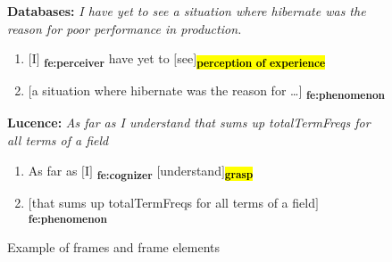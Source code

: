 





\begin{figure}[h!]
\begin{mdframed}
\begin{scriptsize}
\noindent \textbf{Databases:} \textit{I have yet to see a situation where hibernate was the reason for poor performance in production.}
{\ttfamily%
\begin{enumerate}[itemindent=0.5em,leftmargin=0.5em]
\item[] $\big[$I$\big]$\textsubscript{\color{rufous} \textbf{fe:perceiver}} have yet to $\big[$see$\big]$\textsubscript{\hl{\textbf{perception of experience}}} 

\item[] $\big[$a situation where hibernate was the reason for \dots$\big]$\textsubscript{\color{rufous} \textbf{fe:phenomenon}}
\end{enumerate}
}%

\smallskip
\noindent \textbf{Lucence:} \textit{As far as I understand that sums up totalTermFreqs for all terms of a field}
{\ttfamily%
\begin{enumerate}[itemindent=0.5em,leftmargin=0.5em]
\item[] As far as $\big[$I$\big]$\textsubscript{\color{rufous} \textbf{fe:cognizer}} $\big[$understand$\big]$\textsubscript{\hl{\textbf{grasp}}} 

\item[] $\big[$that sums up totalTermFreqs for all terms of a field$\big]$\textsubscript{\color{rufous} \textbf{fe:phenomenon}}
\end{enumerate}
}%
\end{scriptsize}
\end{mdframed}
    \caption{Example of frames and frame elements}
    \label{fig:frame-examples}
\end{figure}